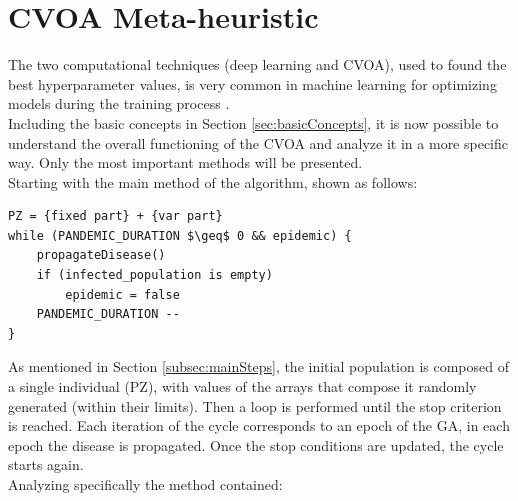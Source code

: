\documentclass[letterpaper]{article}%
\begin{document}
\section{CVOA Meta-heuristic}
The two computational techniques (deep learning and CVOA), used to found the best hyperparameter values, is very common in machine learning for optimizing models during the training process \cite{Calvet, Darwish2019ASO,Devikanniga}.\\
Including the basic concepts in Section \ref{sec:basicConcepts}, it is now possible to understand the overall functioning of the CVOA and analyze it in a more specific way.
Only the most important methods will be presented.\\
 Starting with the main method of the algorithm, shown as follows:

\lstset{language=Python}
\lstset{frame=lines}
\lstset{basicstyle=\footnotesize}
\lstset{showstringspaces=false}
\lstset{numbers=left}				
\lstset{stepnumber=1}
\begin{lstlisting}[mathescape=true]
PZ = {fixed part} + {var part}
while (PANDEMIC_DURATION $\geq$ 0 && epidemic) {
    propagateDisease()
    if (infected_population is empty)
        epidemic = false
    PANDEMIC_DURATION --
}
\end{lstlisting}
As mentioned in Section \ref{subsec:mainSteps}, the initial population is composed of a single individual (PZ), with values of the arrays that compose it randomly generated (within their limits). Then a loop is performed until the stop criterion is reached. Each iteration of the cycle corresponds to an epoch of the GA, in each epoch the disease is propagated. Once the stop conditions are updated, the cycle starts again.\\
Analyzing specifically the method contained:
\end{document}
